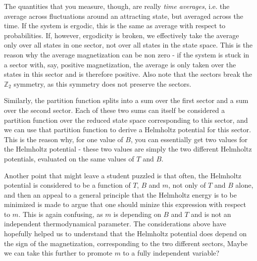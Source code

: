 \documentclass[a4paper, draft]{article}
\theoremstyle{own}
\theoremstyle{remark}
\newcommand{\Z}{\mathbb{Z}}
\begin{document}
The quantities that you measure, though, are really {\em time averages}, i.e. the average across fluctuations around an attracting state, but averaged across the time. If the system is ergodic, this is the same as average with respect to probabilities. If, however, ergodicity is broken, we effectively take the average only over all states in one sector, not over all states in the state space. This is the reason why the average magnetization can be non zero - if the system is stuck in a sector with, say, positive magnetization, the average is only taken over the states in this sector and is therefore positive. Also note that the sectors break the $\Z_2$ symmetry, as this symmetry does not preserve the sectors.

Similarly, the partition function splits into a sum over the first sector and a sum over the second sector. Each of these two sums can itself be considered a partition function over the reduced state space corresponding to this sector, and we can use that partition function to derive a Helmholtz potential for this sector. This is the reason why, for one value of $B$, you can essentially get two values for the Helmholtz potential - these two values are simply the two different Helmholtz potentials, evaluated on the same values of $T$ and $B$. 

Another point that might leave a student puzzled is that often, the Helmholtz potential is considered to be a function of $T$, $B$ and $m$, not only of $T$ and $B$ alone, and then an appeal to a general principle that the Helmholtz energy is to be minimized is made to argue that one should minize this expression with respect to $m$. This is again confusing, as $m$ is depending on $B$ and $T$ and is not an independent thermodynamical parameter. The considerations above have hopefully helped us to understand that the Helmholtz potential does depend on the sign of the magnetization, corresponding to the two different sectors, Maybe we can take this further to promote $m$ to a fully independent variable?
\end{document}

